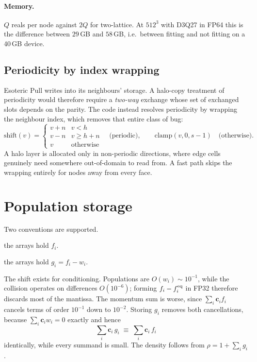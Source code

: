\documentclass[11pt,a4paper]{article}
\newcommand{\ci}{\bm{c}_i}
\begin{document}
\paragraph{Memory.} $Q$ reals per node against $2Q$ for two-lattice. At
$512^3$ with D3Q27 in FP64 this is the difference between $29$\,GB and $58$\,GB,
i.e.\ between fitting and not fitting on a 40\,GB device.

\subsection{Periodicity by index wrapping}
\label{sec:periodic}

Esoteric Pull writes into its neighbours' storage. A halo-copy treatment of
periodicity would therefore require a \emph{two-way} exchange whose set of
exchanged slots depends on the parity. The code instead resolves periodicity by
wrapping the neighbour index, which removes that entire class of bug:
\begin{equation}
  \mathrm{shift}(v) =
  \begin{cases}
    v+n & v < h \\ v-n & v \geq h+n \\ v & \text{otherwise}
  \end{cases}
  \quad\text{(periodic)}, \qquad
  \mathrm{clamp}(v,0,s-1) \quad\text{(otherwise)}.
\end{equation}
A halo layer is allocated only in non-periodic directions, where edge cells
genuinely need somewhere out-of-domain to read from. A fast path skips the
wrapping entirely for nodes away from every face.

\section{Population storage}
\label{sec:storage}

Two conventions are supported.

\begin{description}[leftmargin=1.6em]
\item[Raw] the arrays hold $f_i$.
\item[Shifted] the arrays hold $g_i = f_i - w_i$.
\end{description}

The shift exists for conditioning. Populations are $O(w_i)\sim10^{-1}$, while the
collision operates on differences $O(10^{-6})$; forming $f_i - f_i^{\rm eq}$ in
FP32 therefore discards most of the mantissa. The momentum sum is worse, since
$\sum_i \ci f_i$ cancels terms of order $10^{-1}$ down to $10^{-2}$. Storing
$g_i$ removes both cancellations, because $\sum_i \ci w_i = 0$ exactly and hence
\begin{equation}
  \sum_i \ci\, g_i \;\equiv\; \sum_i \ci\, f_i
\end{equation}
identically, while every summand is small. The density follows from
$\rho = 1 + \sum_i g_i$.
\end{document}
